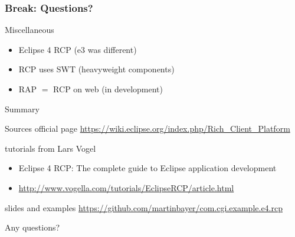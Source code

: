 \documentclass{beamer}
\newcommand{\str}[1]{\structure{#1}}
\newcommand{\breakframe}{\begin{fillerframe}\frametitle{Break: Questions?}\end{fillerframe}}
\let\oldurl\url
\renewcommand{\url}[1]{\textcolor{pumpkin}{\scriptsize\oldurl{#1}}}
\begin{document}
\breakframe

\begin{frame}{Miscellaneous}
	\begin{itemize}
		\item Eclipse 4 RCP (e3 was different)
		\item RCP uses SWT (heavyweight components)
		\item RAP $=$ RCP on web (in development)
	\end{itemize}
\end{frame}
\begin{frame}{Summary}
\end{frame}
\begin{frame}{Sources}
	official page \url{https://wiki.eclipse.org/index.php/Rich_Client_Platform}

	tutorials from Lars Vogel
		\begin{itemize}
			\item Eclipse 4 RCP: The complete guide to Eclipse application development
			\item\url{http://www.vogella.com/tutorials/EclipseRCP/article.html}
		\end{itemize}

	slides and examples \url{https://github.com/martinbayer/com.cgi.example.e4.rcp}
\end{frame}
\begin{simpleframe}
	\str{\Huge THANK YOU}

	\Large Any questions?
\end{simpleframe}
\end{document}
